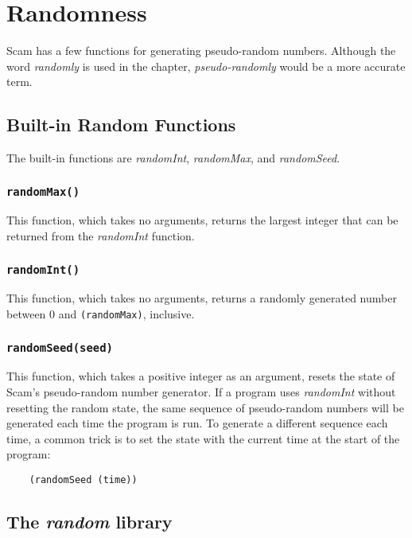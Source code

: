 \chapter{Randomness}
\label{Randomness}

Scam has a few functions for generating pseudo-random numbers.
Although the word {\it randomly} is used in the chapter,
{\it pseudo-randomly}
would be a more accurate term.

\section{Built-in Random Functions}

The built-in functions are
{\it randomInt}, {\it randomMax}, and {\it randomSeed}.

\subsection*{{\tt randomMax()}}

This function, which takes no arguments, returns the largest
integer
that can be returned from the {\it randomInt} function.

\subsection*{{\tt randomInt()}}

This function, which takes no arguments,
returns a randomly generated number between 0
and \verb!(randomMax)!, inclusive.

\subsection*{{\tt randomSeed(seed)}}

This function, which takes a positive integer as an
argument, resets the state of Scam's pseudo-random number
generator. If a program uses {\it randomInt} without resetting the
random state, the same sequence of pseudo-random numbers will
be generated each time the program is run. To generate a
different sequence each time, a common trick is to set the
state with the current time at the start of the program:

\begin{verbatim}
    (randomSeed (time))
\end{verbatim}

\section{The {\it random} library}

